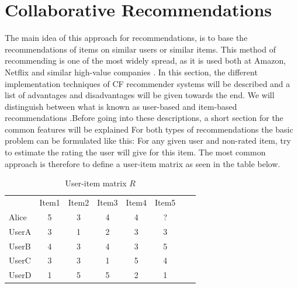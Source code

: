 \section{Collaborative Recommendations}
\label{sec:collaborative}
The main idea of this approach for recommendations, is to base the recommendations of items on similar users or similar items.\newline
This method of recommending is one of the most widely spread, as it is used both at Amazon, Netflix and similar high-value companies \citep{AmazonRecommendations}.\newline
In this section, the different implementation techniques of CF recommender systems will be described and a list of advantages and disadvantages will be given towards the end. We will distinguish between what is known as user-based and item-based recommendations \citep{IntroductionRecommenderSystems}.Before going into these descriptions, a short section for the common features will be explained\newline
For both types of recommendations the basic problem can be formulated like this: For any given user and non-rated item, try to estimate the rating the user will give for this item.\newline
The most common approach is therefore to define a user-item matrix as seen in the table below.


\begin{table}[H]
\begin{center}
\begin{tabular}{l c c c c c c r }
  & Item1 & Item2 & Item3 & Item4 & Item5 \\ 
 Alice & 5 & 3 & 4 & 4 & ? \\
 UserA & 3 & 1 & 2 & 3 & 3 \\
 UserB & 4 & 3 & 4 & 3 & 5 \\
 UserC & 3 & 3 & 1 & 5 & 4 \\
 UserD & 1 & 5 & 5 & 2 & 1
\end{tabular}
\caption{User-item matrix \(R\)}
\label{tableofratings} 
\end{center}
\end{table}


